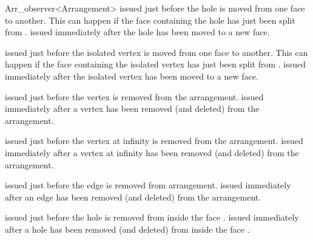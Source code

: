 \begin{ccRefClass}{Arr_observer<Arrangement>}
    {issued just before the hole  is moved from one face to another.
     This can happen if the face  containing the hole has just
     been split from .}
\ccGlue
{}
    {issued immediately after the hole  has been moved to a new face.}

    {issued just before the isolated vertex  is moved from one face
     to another.
     This can happen if the face  containing the isolated vertex
     has just been split from .}
\ccGlue
{}
    {issued immediately after the isolated vertex  has been moved to a 
     new face.}

    {issued just before the vertex  is removed from the arrangement.}
\ccGlue
{}
    {issued immediately after a vertex has been removed (and deleted)
     from the arrangement.}

    {issued just before the vertex at infinity  is removed from the
     arrangement.}
\ccGlue
{}
    {issued immediately after a vertex at infinity has been removed
     (and deleted) from the arrangement.}

    {issued just before the edge  is removed from arrangement.}
\ccGlue
{}
    {issued immediately after an edge has been removed (and deleted)
     from the arrangement.}

    {issued just before the hole  is removed from inside the
     face .}
\ccGlue
{}
    {issued immediately after a hole has been removed (and deleted)
     from inside the face .}

\end{ccRefClass}

\ccRefPageEnd
